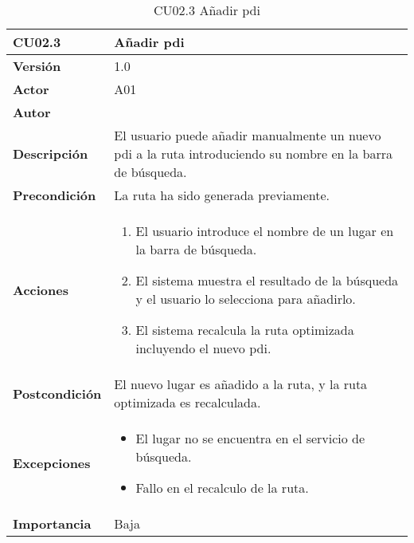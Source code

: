 \begin{table}[p]
	\centering
	\begin{tabularx}{\linewidth}{ p{} p{} }
		\toprule
		\textbf{CU02.3}    & \textbf{Añadir \acrfull{pdi}} \\
		\toprule
		\textbf{Versión}              & 1.0    \\
		\textbf{Actor}                & A01 \\
		\textbf{Autor}                & \autor \\
		\textbf{Descripción}          & El usuario puede añadir manualmente un nuevo \acrshort{pdi} a la ruta introduciendo su nombre en la barra de búsqueda. \\
		\textbf{Precondición}         & La ruta ha sido generada previamente. \\
		\textbf{Acciones}             &
		\begin{enumerate}
			\def\labelenumi{\arabic{enumi}.}
			\tightlist
			\item El usuario introduce el nombre de un lugar en la barra de búsqueda.
			\item El sistema muestra el resultado de la búsqueda y el usuario lo selecciona para añadirlo.
			\item El sistema recalcula la ruta optimizada incluyendo el nuevo \acrlong{pdi}.
		\end{enumerate}\\
		\textbf{Postcondición}        & El nuevo lugar es añadido a la ruta, y la ruta optimizada es recalculada. \\
		\textbf{Excepciones}          & 
		\begin{itemize}
			\tightlist
			\item El lugar no se encuentra en el servicio de búsqueda.
			\item Fallo en el recalculo de la ruta.
		\end{itemize}\\
		\textbf{Importancia}          & Baja \\
		\bottomrule
	\end{tabularx}
	\caption{CU02.3 Añadir \acrfull{pdi}}
\end{table}


